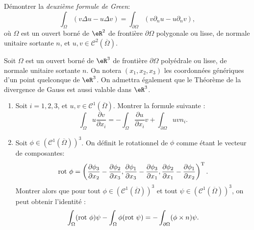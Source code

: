 \medskip

\begin{exercice}\label{exoChWeak_2Green}

Démontrer la \emph{deuxième formule de Green}:
\[
\int_\Omega ( v \Delta u  - u \Delta v ) = 
\int_{\partial \Omega} ( v \partial_n u - u \partial_n v ),
\]
où $\Omega$ est un ouvert borné de $\eR^2$ de frontière $\partial \Omega$ polygonale ou lisse, de normale unitaire sortante $n$, et $u,v \in \mathcal{C}^2(\overline{\Omega})$.

\end{exercice}

\medskip

\begin{exercice}\label{exoChWeak_rot}

Soit $\Omega$ est un ouvert borné de $\eR^3$ de frontière $\partial \Omega$ polyédrale ou lisse, de normale unitaire sortante $n$. On notera $(x_1,x_2,x_3)$ les coordonnées génériques d'un point quelconque de $\eR^3$. On admettra également que le Théorème de la divergence de Gauss est aussi valable dans $\eR^3$.

\begin{enumerate}

\item Soit $i=1,2,3$, et $u,v \in \mathcal{C}^1(\overline{\Omega})$. Montrer la formule suivante :
\[
\int_\Omega  u \frac{\partial v}{\partial x_i}
=
- \int_\Omega \frac{\partial u}{\partial x_i} v
+ \int_{\partial \Omega} { u v n_i}.
\]

\item Soit $\phi \in (\mathcal{C}^1(\overline{\Omega}))^3$. On définit le rotationnel de $\phi$ comme étant le vecteur de composantes:
\[
\hbox{rot } \phi = \left (
\frac{\partial \phi_3}{\partial x_2} - \frac{\partial \phi_2}{\partial x_3},
\frac{\partial \phi_1}{\partial x_3} - \frac{\partial \phi_3}{\partial x_1},
\frac{\partial \phi_2}{\partial x_1} - \frac{\partial \phi_1}{\partial x_2}
\right )^{\mathrm{T}}.
\]
Montrer alors que pour tout $\phi \in (\mathcal{C}^1(\overline{\Omega}))^3$ et tout $\psi \in (\mathcal{C}^1(\overline{\Omega}))^3$, on peut obtenir l'identité :
\[
\int_\Omega  ( \hbox{rot } \phi ) \psi
- \int_\Omega \phi ( \hbox{rot } \psi)
= - \int_{\partial \Omega} ( \phi \times n ) \psi.
\]

\end{enumerate}

\end{exercice}

\medskip

